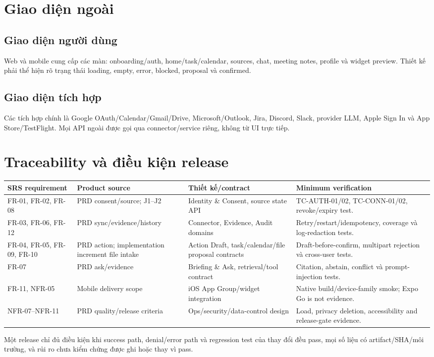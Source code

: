\documentclass[11pt,a4paper]{article}
\newcommand{\code}[1]{\texttt{\detokenize{#1}}}
\begin{document}
\section{Giao diện ngoài}
\subsection{Giao diện người dùng}
Web và mobile cung cấp các màn: onboarding/auth, home/task/calendar, sources, chat, meeting notes, profile và widget preview. Thiết kế phải thể hiện rõ trạng thái loading, empty, error, blocked, proposal và confirmed.

\subsection{Giao diện tích hợp}
Các tích hợp chính là Google OAuth/Calendar/Gmail/Drive, Microsoft/Outlook, Jira, Discord, Slack, provider LLM, Apple Sign In và App Store/TestFlight. Mọi API ngoài được gọi qua connector/service riêng, không từ UI trực tiếp.

\section{Traceability và điều kiện release}
\begin{longtable}{p{2cm}p{3.3cm}p{3.4cm}p{4.6cm}}
\toprule SRS requirement & Product source & Thiết kế/contract & Minimum verification \\ \midrule\endhead
FR-01, FR-02, FR-08 & PRD consent/source; J1--J2 & Identity \& Consent, source state API & TC-AUTH-01/02, TC-CONN-01/02, revoke/expiry test. \\
FR-03, FR-06, FR-12 & PRD sync/evidence/history & Connector, Evidence, Audit domains & Retry/restart/idempotency, coverage và log-redaction tests. \\
FR-04, FR-05, FR-09, FR-10 & PRD action; implementation increment file intake & Action Draft, task/calendar/file proposal contracts & Draft-before-confirm, multipart rejection và cross-user tests. \\
FR-07 & PRD ask/evidence & Briefing \& Ask, retrieval/tool contract & Citation, abstain, conflict và prompt-injection tests. \\
FR-11, NFR-05 & Mobile delivery scope & iOS App Group/widget integration & Native build/device-family smoke; Expo Go is not evidence. \\
NFR-07--NFR-11 & PRD quality/release criteria & Ops/security/data-control design & Load, privacy deletion, accessibility and release-gate evidence. \\
\bottomrule
\end{longtable}
Một release chỉ đủ điều kiện khi success path, denial/error path và regression test của thay đổi đều pass, mọi số liệu có artifact/SHA/môi trường, và rủi ro chưa kiểm chứng được ghi \code{blocked} hoặc \code{pending} thay vì pass.
\end{document}
